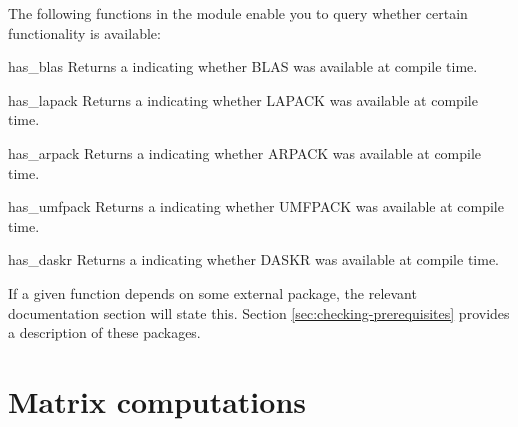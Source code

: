 The following functions in the module  enable you
to query whether certain functionality is available:

\begin{funcdesc}{has_blas}{}
  Returns a  indicating whether BLAS was available at
  compile time.
\end{funcdesc}
\begin{funcdesc}{has_lapack}{}
  Returns a  indicating whether LAPACK was available at
  compile time.
\end{funcdesc}
\begin{funcdesc}{has_arpack}{}
  Returns a  indicating whether ARPACK was available at
  compile time.
\end{funcdesc}
\begin{funcdesc}{has_umfpack}{}
  Returns a  indicating whether UMFPACK was available at
  compile time.
\end{funcdesc}
\begin{funcdesc}{has_daskr}{}
  Returns a  indicating whether DASKR was available at
  compile time.
\end{funcdesc}

If a given function depends on some external package, the relevant
documentation section will state this.  Section
\ref{sec:checking-prerequisites} provides a description of these packages.

\section{Matrix computations}

